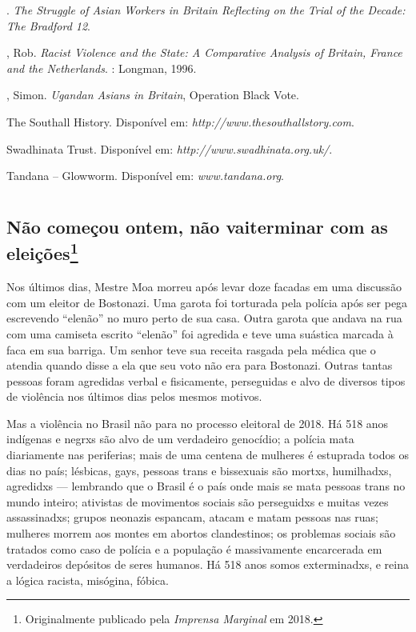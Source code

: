 \begin{Parskip}
. \emph{The Struggle of Asian Workers in Britain Reflecting on the Trial of the Decade: The Bradford 12}.

, Rob. \emph{Racist Violence and the State: A Comparative Analysis of Britain, France and the Netherlands}. : Longman, 1996.

, Simon. \emph{Ugandan Asians in Britain}, Operation Black Vote.

The Southall History. Disponível em: \emph{http://www.thesouthallstory.com}.

Swadhinata Trust. Disponível em: \emph{http://www.swadhinata.org.uk/}.

Tandana -- Glowworm. Disponível em:  \emph{www.tandana.org}.
\end{Parskip}


\part{}

\chapter[Não começou ontem, não vai terminar com as eleições]{Não começou ontem, não vai\break terminar com as eleições\footnote[*]{Originalmente publicado pela \emph{Imprensa Marginal} em 2018.}}



Nos últimos dias, Mestre Moa morreu após levar doze facadas em uma discussão com um eleitor de Bostonazi. Uma garota foi torturada pela polícia após ser pega escrevendo ``elenão'' no muro perto de sua casa. Outra garota que andava na rua com uma camiseta escrito ``elenão'' foi agredida e teve uma suástica marcada à faca em sua barriga. Um senhor teve sua receita rasgada pela médica que o atendia quando disse a ela que seu voto não era para Bostonazi. Outras tantas pessoas foram agredidas verbal e fisicamente, perseguidas e alvo de diversos tipos de violência nos últimos dias pelos mesmos motivos.

Mas a violência no Brasil não para no processo eleitoral de 2018. Há 518 anos indígenas e negrxs são alvo de um verdadeiro genocídio; a polícia mata diariamente nas periferias; mais de uma centena de mulheres é estuprada todos os dias no país; lésbicas, gays, pessoas trans e bissexuais são mortxs, humilhadxs, agredidxs --- lembrando que o Brasil é o país onde mais se mata pessoas trans no mundo inteiro; ativistas de movimentos sociais são perseguidxs e muitas vezes assassinadxs; grupos neonazis espancam, atacam e matam pessoas nas ruas; mulheres morrem aos montes em abortos clandestinos; os problemas sociais são tratados como caso de polícia e a população é massivamente encarcerada em verdadeiros depósitos de seres humanos. Há 518 anos somos exterminadxs, e reina a lógica racista, misógina, fóbica.

